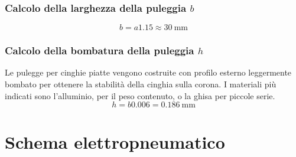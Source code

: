 \documentclass{report}
\begin{document}
\subsubsection{Calcolo della larghezza della puleggia $b$}
\begin{equation}
  b = a\num{1,15}\approx\SI{30}{\mm}
\end{equation}
\subsubsection{Calcolo della bombatura della puleggia $h$}
Le pulegge per cinghie piatte vengono costruite con profilo esterno leggermente bombato per ottenere la stabilità della cinghia sulla corona. I materiali più indicati sono l’alluminio, per il peso contenuto, o la ghisa per piccole serie.
\begin{equation}
 h=b\num{0,006}=\SI{0.186}{\mm}
\end{equation}
\section{Schema elettropneumatico}
\end{document}
